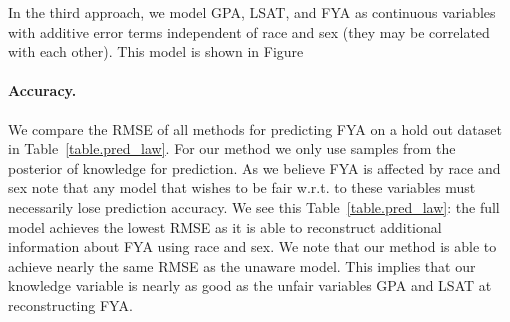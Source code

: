 In the third approach, we model GPA, LSAT, and FYA as continuous variables with additive error terms independent of race and sex (they may be correlated with each other). This model is shown in Figure






\paragraph{Accuracy.}
We compare the RMSE of all methods for predicting FYA on a hold out dataset in Table~\ref{table.pred_law}. For our method we only use samples from the posterior of knowledge for prediction. As we believe FYA is affected by race and sex note that any model that wishes to be fair w.r.t. to these variables must necessarily lose prediction accuracy. We see this Table~\ref{table.pred_law}: the full model achieves the lowest RMSE as it is able to reconstruct additional information about FYA using race and sex. We note that our method is able to achieve nearly the same RMSE as the unaware model. This implies that our knowledge variable is nearly as good as the unfair variables GPA and LSAT at reconstructing FYA.


